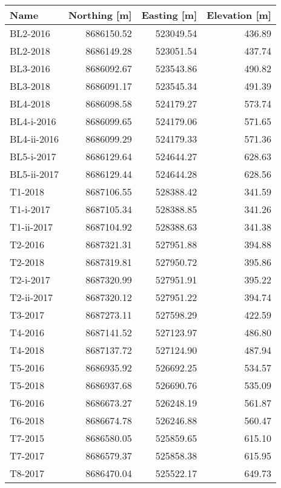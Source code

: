 \begin{tabular}{lrrr}
\toprule
        Name &  Northing [m] &  Easting [m] &  Elevation [m] \\
\midrule
    BL2-2016 &    8686150.52 &    523049.54 &         436.89 \\
    BL2-2018 &    8686149.28 &    523051.54 &         437.74 \\
    BL3-2016 &    8686092.67 &    523543.86 &         490.82 \\
    BL3-2018 &    8686091.17 &    523545.34 &         491.39 \\
    BL4-2018 &    8686098.58 &    524179.27 &         573.74 \\
  BL4-i-2016 &    8686099.65 &    524179.06 &         571.65 \\
 BL4-ii-2016 &    8686099.29 &    524179.33 &         571.36 \\
  BL5-i-2017 &    8686129.64 &    524644.27 &         628.63 \\
 BL5-ii-2017 &    8686129.44 &    524644.28 &         628.56 \\
     T1-2018 &    8687106.55 &    528388.42 &         341.59 \\
   T1-i-2017 &    8687105.34 &    528388.85 &         341.26 \\
  T1-ii-2017 &    8687104.92 &    528388.63 &         341.38 \\
     T2-2016 &    8687321.31 &    527951.88 &         394.88 \\
     T2-2018 &    8687319.81 &    527950.72 &         395.86 \\
   T2-i-2017 &    8687320.99 &    527951.91 &         395.22 \\
  T2-ii-2017 &    8687320.12 &    527951.22 &         394.74 \\
     T3-2017 &    8687273.11 &    527598.29 &         422.59 \\
     T4-2016 &    8687141.52 &    527123.97 &         486.80 \\
     T4-2018 &    8687137.72 &    527124.90 &         487.94 \\
     T5-2016 &    8686935.92 &    526692.25 &         534.57 \\
     T5-2018 &    8686937.68 &    526690.76 &         535.09 \\
     T6-2016 &    8686673.27 &    526248.19 &         561.87 \\
     T6-2018 &    8686674.78 &    526246.88 &         560.47 \\
     T7-2015 &    8686580.05 &    525859.65 &         615.10 \\
     T7-2017 &    8686579.37 &    525858.38 &         615.95 \\
     T8-2017 &    8686470.04 &    525522.17 &         649.73 \\
\bottomrule
\end{tabular}
